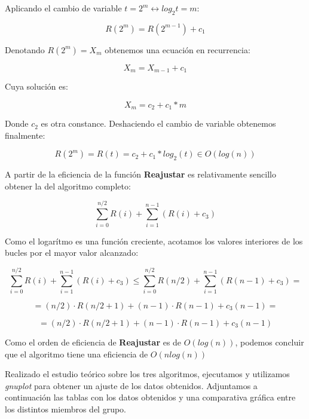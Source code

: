 \documentclass[11pt,a4paper]{article}
\begin{document}
Aplicando el cambio de variable $t = 2^m \leftrightarrow log_2 t = m$:

$$R(2^m) = R(2^{m-1}) + c_1$$

Denotando $R(2^m) = X_m$ obtenemos una ecuación en recurrencia:

$$X_m = X_{m-1} + c_1$$

Cuya solución es:

$$X_m = c_2 + c_1 * m$$

Donde $c_2$ es otra constance. Deshaciendo el cambio de variable obtenemos finalmente:

$$R(2^m) = R(t) = c_2 + c_1 * log_2(t) \in O(log(n))$$

A partir de la eficiencia de la función \textbf{Reajustar} es relativamente sencillo obtener la del algoritmo completo:

$$\sum_{i=0}^{n/2} R(i) + \sum_{i=1}^{n-1} (R(i) + c_3) $$

Como el logarítmo es una función creciente, acotamos los valores interiores de los bucles por el mayor valor alcanzado:

$$\sum_{i=0}^{n/2} R(i) + \sum_{i=1}^{n-1} (R(i) + c_3) \leq \sum_{i=0}^{n/2} R(n/2) + \sum_{i=1}^{n-1} (R(n-1) + c_3) = $$

$$= (n/2) \cdot R(n/2 + 1) + (n-1) \cdot R(n - 1) + c_3(n-1) = $$

$$= (n/2) \cdot R(n/2 + 1) + (n-1) \cdot R(n - 1) + c_3(n-1)$$

Como el orden de eficiencia de \textbf{Reajustar} es de $O(log(n))$, podemos concluir que el algoritmo tiene una eficiencia de $O(nlog(n))$

Realizado el estudio teórico sobre los tres algoritmos, ejecutamos y utilizamos \emph{gnuplot} para obtener un ajuste de los datos obtenidos. Adjuntamos a continuación las tablas con los datos obtenidos y una comparativa gráfica entre los distintos miembros del grupo.
\end{document}

